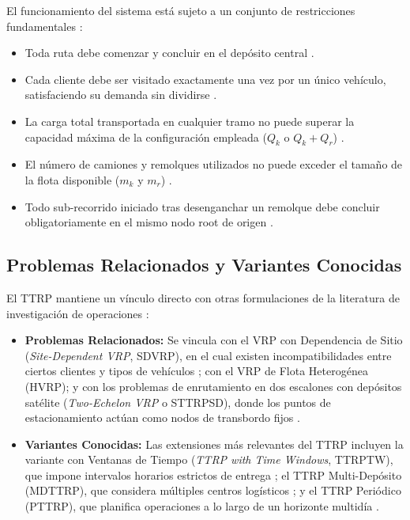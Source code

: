 \documentclass[letter, 10pt]{article}
\begin{document}
\vspace{0.25cm}

El funcionamiento del sistema est\'a sujeto a un conjunto de restricciones fundamentales \cite{bartolini2020two,chao2002tabu}:
\begin{itemize}
    \item Toda ruta debe comenzar y concluir en el dep\'osito central \cite{chao2002tabu}.
    \item Cada cliente debe ser visitado exactamente una vez por un \'unico veh\'iculo, satisfaciendo su demanda sin dividirse \cite{lin2009solving}.
    \item La carga total transportada en cualquier tramo no puede superar la capacidad m\'axima de la configuraci\'on empleada ($Q_k$ o $Q_k + Q_r$) \cite{chao2002tabu}.
    \item El n\'umero de camiones y remolques utilizados no puede exceder el tama\~no de la flota disponible ($m_k$ y $m_r$) \cite{lin2009solving}.
    \item Todo sub-recorrido iniciado tras desenganchar un remolque debe concluir obligatoriamente en el mismo nodo root de origen \cite{bartolini2020two,lin2009solving}.
\end{itemize}


\subsection{Problemas Relacionados y Variantes Conocidas}
El TTRP mantiene un v\'inculo directo con otras formulaciones de la literatura de investigaci\'on de operaciones \cite{bartolini2020two,chao2002tabu}:
\begin{itemize}
    \item \textbf{Problemas Relacionados:} Se vincula con el VRP con Dependencia de Sitio (\textit{Site-Dependent VRP}, SDVRP), en el cual existen incompatibilidades entre ciertos clientes y tipos de veh\'iculos \cite{chao2002tabu}; con el VRP de Flota Heterog\'enea (HVRP); y con los problemas de enrutamiento en dos escalones con dep\'ositos sat\'elite (\textit{Two-Echelon VRP} o STTRPSD), donde los puntos de estacionamiento act\'uan como nodos de transbordo fijos \cite{bartolini2020two}.
    \item \textbf{Variantes Conocidas:} Las extensiones m\'as relevantes del TTRP incluyen la variante con Ventanas de Tiempo (\textit{TTRP with Time Windows}, TTRPTW), que impone intervalos horarios estrictos de entrega \cite{parragh2012hybrid}; el TTRP Multi-Dep\'osito (MDTTRP), que considera m\'ultiples centros log\'isticos \cite{scheuerer2006tabu}; y el TTRP Peri\'odico (PTTRP), que planifica operaciones a lo largo de un horizonte multid\'ia \cite{derigs2013model}.
\end{itemize}
\end{document}
